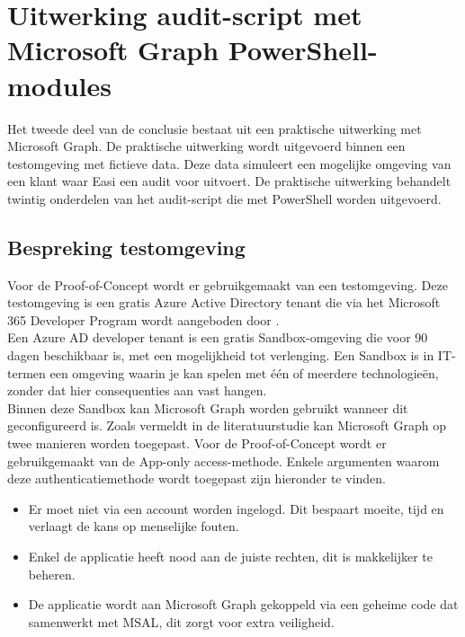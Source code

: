 
\chapter{Uitwerking audit-script met Microsoft Graph PowerShell-modules}%
\label{ch:poc}


Het tweede deel van de conclusie bestaat uit een praktische uitwerking met Microsoft Graph. De praktische uitwerking wordt uitgevoerd binnen een testomgeving met fictieve data. Deze data simuleert een mogelijke omgeving van een klant waar Easi een audit voor uitvoert. De praktische uitwerking behandelt twintig onderdelen van het audit-script die met PowerShell worden uitgevoerd.

\section{Bespreking testomgeving}


Voor de Proof-of-Concept wordt er gebruikgemaakt van een testomgeving. Deze testomgeving is een gratis Azure Active Directory tenant die via het Microsoft 365 Developer Program wordt aangeboden door \textcite{Microsoft2023q}. \\

Een Azure \ac{AD} developer tenant is een gratis Sandbox-omgeving die voor 90 dagen beschikbaar is, met een mogelijkheid tot verlenging. Een Sandbox is in \ac{IT}-termen een omgeving waarin je kan spelen met één of meerdere technologieën, zonder dat hier consequenties aan vast hangen. \\

Binnen deze Sandbox kan Microsoft Graph worden gebruikt wanneer dit  geconfigureerd is. Zoals vermeldt in de literatuurstudie kan Microsoft Graph op twee manieren worden toegepast. Voor de Proof-of-Concept wordt er gebruikgemaakt van de App-only access-methode. Enkele argumenten waarom deze authenticatiemethode wordt toegepast zijn hieronder te vinden. 

\begin{itemize}
    \item Er moet niet via een account worden ingelogd. Dit bespaart moeite, tijd en verlaagt de kans op menselijke fouten.
    \item Enkel de applicatie heeft nood aan de juiste rechten, dit is makkelijker te beheren.
    \item De applicatie wordt aan Microsoft Graph gekoppeld via een geheime code dat samenwerkt met \ac{MSAL}, dit zorgt voor extra veiligheid.
\end{itemize}


